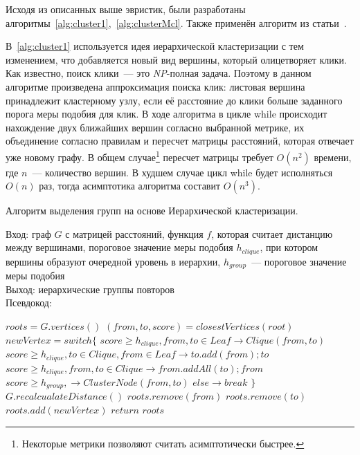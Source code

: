 Исходя из описанных выше эвристик, были разработаны алгоритмы~\ref{alg:cluster1},~\ref{alg:clusterMcl}.
Также применён алгоритм из статьи~\cite{tofigh2009optimum}.

В~\ref{alg:cluster1} используется идея иерархической кластеризации с тем изменением, что добавляется новый вид вершины, который олицетворяет клики.
Как известно, поиск клики~--- это \emph{NP}-полная задача.
Поэтому в данном алгоритме произведена аппроксимация поиска клик: листовая вершина принадлежит кластерному узлу, если её расстояние до клики больше заданного порога меры подобия для клик.
В ходе алгоритма в цикле while происходит нахождение двух ближайших вершин согласно выбранной метрике, их объединение согласно правилам и пересчет матрицы расстояний, которая отвечает уже новому графу.
В общем случае\footnote{Некоторые метрики позволяют считать асимптотически быстрее.} пересчет матрицы требует $O(n^2)$ времени, где $n$~--- количество вершин.
В худшем случае  цикл while будет исполняться $O(n)$ раз,
тогда асимптотика алгоритма составит $O(n^3)$.

\begin{algorithm}[t!]
\caption{Алгоритм выделения групп на основе Иерархической кластеризации.}\label{alg:cluster1}
Вход: граф $G$ с матрицей расстояний, функция  $f$, которая считает дистанцию между вершинами, пороговое значение меры подобия $h_{clique}$, при котором вершины образуют очередной уровень в иерархии, $h_{group}$~--- пороговое значение меры подобия\\
Выход: иерархические группы повторов \\
Псевдокод:
\begin{algorithmic}[1]
\State $roots = G.vertices()$
\State $(from, to,score) = closestVertices(root)$
\State $newVertex = switch \{$
\State $score\geq h_{clique} , from,to \in Leaf \rightarrow Clique(from,to) $
\State $score\geq h_{clique} , to \in Clique,from \in Leaf \rightarrow to.add(from);to $
\State $score\geq h_{clique} , from,to \in Clique \rightarrow from.addAll(to);from$
\State $score\geq h_{group}, \rightarrow ClusterNode(from,to) $
\State $else \rightarrow break$ 
\State $\}$
\State $G.recalcualateDistance()$
\State $roots.remove(from)$
\State $roots.remove(to)$
\State $roots.add(newVertex)$
\EndWhile
\State $return$ $roots$
\end{algorithmic}
\end{algorithm}

